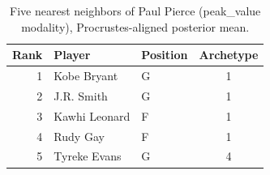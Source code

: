 \begin{table}[htbp]
  \centering\small
  \begin{tabular}{rllc}
    \toprule
    Rank & Player & Position & Archetype \\
    \midrule
    1 & Kobe Bryant & G & 1 \\
    2 & J.R. Smith & G & 1 \\
    3 & Kawhi Leonard & F & 1 \\
    4 & Rudy Gay & F & 1 \\
    5 & Tyreke Evans & G & 4 \\
    \bottomrule
  \end{tabular}
  \caption{Five nearest neighbors of Paul Pierce (peak_value modality), Procrustes-aligned posterior mean.}
  \label{tab:Paul_Pierce_neighbors_peak_value}
\end{table}

